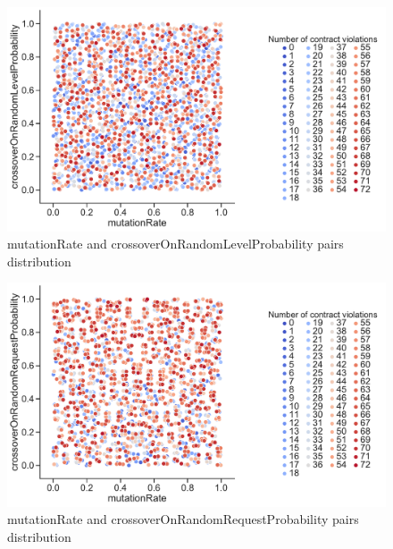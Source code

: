 \begin{figure}
	\centering
	\includegraphics[width=\textwidth]{images/PairsDistr/mutationRate_crossoverOnRandomLevelProbability.pdf}
	\caption[mutationRate and crossoverOnRandomLevelProbability pairs distribution]{mutationRate and crossoverOnRandomLevelProbability pairs distribution}
	\label{fig:mutationRate_crossoverOnRandomLevelProbability_pair}
\end{figure}
\clearpage
\begin{figure}
	\centering
	\includegraphics[width=\textwidth]{images/PairsDistr/mutationRate_crossoverOnRandomRequestProbability.pdf}
	\caption[mutationRate and crossoverOnRandomRequestProbability pairs distribution]{mutationRate and crossoverOnRandomRequestProbability pairs distribution}
	\label{fig:mutationRate_crossoverOnRandomRequestProbability_pair}
\end{figure}
\clearpage
